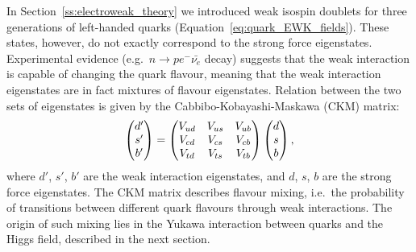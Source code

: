 In Section~\ref{ss:electroweak_theory} we introduced weak isospin doublets for three generations of left-handed quarks
(Equation~\ref{eq:quark_EWK_fields}). These states, however, do not exactly correspond to the strong force eigenstates.
Experimental evidence (e.g.\ $n \rightarrow p e^- \bar{\nu_e}$ decay) suggests that the weak interaction is capable of
changing the quark flavour, meaning that the weak interaction eigenstates are in fact mixtures of flavour eigenstates.
Relation between the two sets of eigenstates is given by the Cabbibo-Kobayashi-Maskawa (CKM) matrix:
\begin{equation}
\begin{pmatrix} d' \\ s' \\ b' \end{pmatrix}
=
\begin{pmatrix}
V_{ud} & V_{us} & V_{ub}  \\
V_{cd} & V_{cs} & V_{cb}  \\
V_{td} & V_{ts} & V_{tb}
\end{pmatrix}
\begin{pmatrix} d \\ s \\ b \end{pmatrix},
\label{eq:CKM}
\end{equation}
where $d'$, $s'$, $b'$ are the weak interaction eigenstates, and $d$, $s$, $b$ are the strong force eigenstates. The CKM
matrix describes flavour mixing, i.e.\ the probability of transitions between different quark flavours through weak
interactions. The origin of such mixing lies in the Yukawa interaction between quarks and the Higgs field, described in
the next section.



